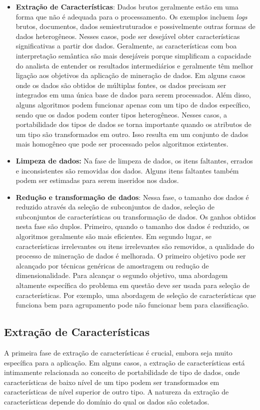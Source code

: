 \begin{itemize}
  \item
\textbf{Extração de Características}: Dados brutos geralmente estão em uma forma que não é adequada para o processamento. Os exemplos incluem \textit{logs} brutos, documentos, dados semiestruturados e possivelmente outras formas de dados heterogêneos. Nesses casos, pode ser desejável obter características significativas a partir dos dados. Geralmente, as características com boa interpretação semântica são mais desejáveis porque simplificam a capacidade do analista de entender os resultados intermediários e geralmente têm melhor ligação aos objetivos da aplicação de mineração de dados. Em alguns casos onde os dados são obtidos de múltiplas fontes, os dados precisam ser integrados em uma única base de dados para serem processados. Além disso, alguns algoritmos podem funcionar apenas com um tipo de dados específico, sendo que os dados podem conter tipos heterogêneos. Nesses casos, a portabilidade dos tipos de dados se torna importante quando os atributos de um tipo são transformados em outro. Isso resulta em um conjunto de dados mais homogêneo que pode ser processado pelos algoritmos existentes.
  \item
\textbf{Limpeza de dados:} Na fase de limpeza de dados, os itens faltantes, errados e inconsistentes são removidas dos dados. Alguns itens faltantes também podem ser estimadas para serem inseridos nos dados.
  \item
\textbf{Redução e transformação de dados}: Nessa fase, o tamanho dos dados é reduzido através da seleção de subconjuntos de dados, seleção de subconjuntos de características ou transformação de dados. Os ganhos obtidos nesta fase são duplos. Primeiro, quando o tamanho dos dados é reduzido, os algoritmos geralmente são mais eficientes. Em segundo lugar, se características irrelevantes ou itens irrelevantes são removidos, a qualidade do processo de mineração de dados é melhorada. O primeiro objetivo pode ser alcançado por técnicas genéricas de amostragem ou redução de dimensionalidade. Para alcançar o segundo objetivo, uma abordagem altamente específica do problema em questão deve ser usada para seleção de características. Por exemplo, uma abordagem de seleção de características que funciona bem para agrupamento pode não funcionar bem para classificação.
\end{itemize}

\subsection{Extração de Características}
A primeira fase de extração de características é crucial, embora seja muito específica para a aplicação. Em alguns casos, a extração de características está intimamente relacionada ao conceito de portabilidade de tipo de dados, onde características de baixo nível de um tipo podem ser transformados em características de nível superior de outro tipo. A natureza da extração de características depende do domínio do qual os dados são coletados.

